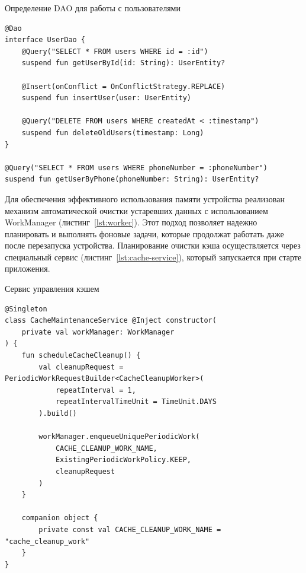\documentclass[14pt, russian]{scrartcl}
\begin{document}
\begin{listing}[!htb]
\caption{Определение DAO для работы с пользователями}
\vspace{-0.3cm}
\label{lst:user-dao}
\begin{verbatim}
@Dao
interface UserDao {
    @Query("SELECT * FROM users WHERE id = :id")
    suspend fun getUserById(id: String): UserEntity?

    @Insert(onConflict = OnConflictStrategy.REPLACE)
    suspend fun insertUser(user: UserEntity)

    @Query("DELETE FROM users WHERE createdAt < :timestamp")
    suspend fun deleteOldUsers(timestamp: Long)
}

@Query("SELECT * FROM users WHERE phoneNumber = :phoneNumber")
suspend fun getUserByPhone(phoneNumber: String): UserEntity?
\end{verbatim}
\end{listing}

Для обеспечения эффективного использования памяти устройства реализован механизм автоматической очистки устаревших данных с использованием WorkManager (листинг~\ref{lst:worker}). Этот подход позволяет надежно планировать и выполнять фоновые задачи, которые продолжат работать даже после перезапуска устройства. Планирование очистки кэша осуществляется через специальный сервис (листинг~\ref{lst:cache-service}), который запускается при старте приложения.

\begin{listing}[!htb]
\caption{Сервис управления кэшем}
\vspace{-0.3cm}
\label{lst:cache-service}
\begin{verbatim}
@Singleton
class CacheMaintenanceService @Inject constructor(
    private val workManager: WorkManager
) {
    fun scheduleCacheCleanup() {
        val cleanupRequest = PeriodicWorkRequestBuilder<CacheCleanupWorker>(
            repeatInterval = 1,
            repeatIntervalTimeUnit = TimeUnit.DAYS
        ).build()

        workManager.enqueueUniquePeriodicWork(
            CACHE_CLEANUP_WORK_NAME,
            ExistingPeriodicWorkPolicy.KEEP,
            cleanupRequest
        )
    }

    companion object {
        private const val CACHE_CLEANUP_WORK_NAME = "cache_cleanup_work"
    }
}
\end{verbatim}
\end{listing}
\end{document}
